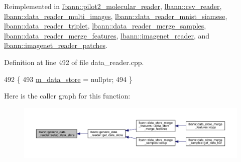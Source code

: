 Reimplemented in \hyperlink{classlbann_1_1pilot2__molecular__reader_a0c18335afe5625a7aa8b8275392c0317}{lbann\+::pilot2\+\_\+molecular\+\_\+reader}, \hyperlink{classlbann_1_1csv__reader_a19175c31963be64ea602d49cfb37bc68}{lbann\+::csv\+\_\+reader}, \hyperlink{classlbann_1_1data__reader__multi__images_ac4c70724fe5f1378a81394cc2e686297}{lbann\+::data\+\_\+reader\+\_\+multi\+\_\+images}, \hyperlink{classlbann_1_1data__reader__mnist__siamese_a410d8aa510fb2f3f4d1a257d5b308819}{lbann\+::data\+\_\+reader\+\_\+mnist\+\_\+siamese}, \hyperlink{classlbann_1_1data__reader__triplet_a2cd6fd46a7d2d90ccd754404683834c6}{lbann\+::data\+\_\+reader\+\_\+triplet}, \hyperlink{classlbann_1_1data__reader__merge__samples_a589d6997ad093721e8c2c2cb3197c9e2}{lbann\+::data\+\_\+reader\+\_\+merge\+\_\+samples}, \hyperlink{classlbann_1_1data__reader__merge__features_a0ac1ade1b2abddfebe263b6f70a839cc}{lbann\+::data\+\_\+reader\+\_\+merge\+\_\+features}, \hyperlink{classlbann_1_1imagenet__reader_a17af38eff1c3aee001d263248b8406a1}{lbann\+::imagenet\+\_\+reader}, and \hyperlink{classlbann_1_1imagenet__reader__patches_afad50e94c5d6bde9dff2abe5bad50e11}{lbann\+::imagenet\+\_\+reader\+\_\+patches}.



Definition at line 492 of file data\+\_\+reader.\+cpp.


\begin{DoxyCode}
492                                                    \{
493   \hyperlink{classlbann_1_1generic__data__reader_aefc076b842933a882214f4f709ca49c9}{m\_data\_store} = \textcolor{keyword}{nullptr};
494 \}
\end{DoxyCode}
Here is the caller graph for this function\+:\nopagebreak
\begin{figure}[H]
\begin{center}
\leavevmode
\includegraphics[width=350pt]{classlbann_1_1generic__data__reader_a8b2a09d38512fc11f1b9d572c89100a7_icgraph}
\end{center}
\end{figure}
\mbox{\label{classlbann_1_1generic__data__reader_af1aaa4d1a693974c1b1f1318b6ed60b8}} 
